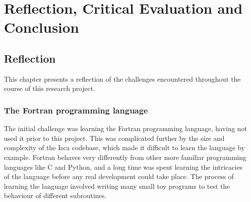 \documentclass[a4paper,11pt]{report}
\begin{document}

\part{Reflection, Critical Evaluation and Conclusion}


\chapter{Reflection}
This chapter presents a reflection of the challenges encountered throughout the course of this research project. 

\section{The Fortran programming language}
The initial challenge was learning the Fortran programming language, having not used it prior to this project. This was complicated further by the size and complexity of the Isca codebase, which made it difficult to learn the language by example. Fortran behaves very differently from other more familiar programming languages like C and Python, and a long time was spent learning the intricacies of the language before any real development could take place. The process of learning the language involved writing many small toy programs to test the behaviour of different subroutines. 

%
%
%

\end{document}
